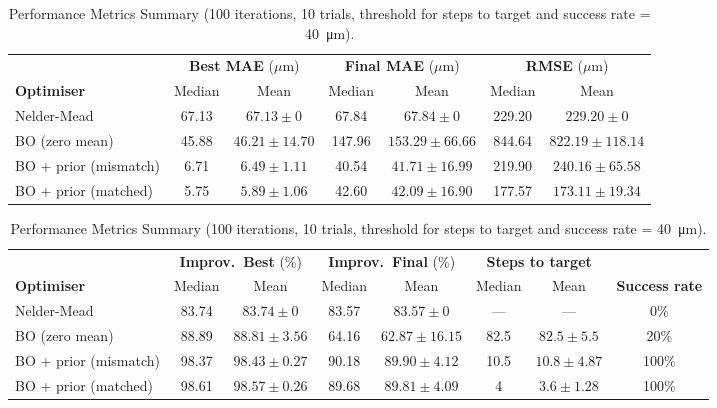 \clearpage
\begin{table}
\centering
\caption{Performance Metrics Summary (100 iterations, 10 trials, threshold for steps to target and success rate = \SI{40}{\micro\metre}).}
\label{table:results_main}
\small
\renewcommand{\arraystretch}{1.3}

\vspace{0.5em}
\begin{tabular}{l cc cc cc}
\toprule
 & \multicolumn{2}{c}{\textbf{Best MAE} ($\mu$m)}
 & \multicolumn{2}{c}{\textbf{Final MAE} ($\mu$m)}
 & \multicolumn{2}{c}{\textbf{RMSE} ($\mu$m)} \\
\cmidrule(lr){2-3} \cmidrule(lr){4-5} \cmidrule(lr){6-7}
\textbf{Optimiser} & Median & Mean & Median & Mean & Median & Mean \\
\midrule
Nelder-Mead           & 67.13 & $67.13 \pm 0$       & 67.84  & $67.84 \pm 0$        & 229.20 & $229.20 \pm 0$       \\
BO (zero mean)        & 45.88 & $46.21 \pm 14.70$   & 147.96 & $153.29 \pm 66.66$   & 844.64 & $822.19 \pm 118.14$ \\
BO + prior (mismatch) & 6.71  & $6.49 \pm 1.11$     & 40.54  & $41.71 \pm 16.99$    & 219.90 & $240.16 \pm 65.58$  \\
BO + prior (matched)  & 5.75  & $5.89 \pm 1.06$     & 42.60  & $42.09 \pm 16.90$    & 177.57 & $173.11 \pm 19.34$  \\
\bottomrule
\end{tabular}

\vspace{1.5em}

\begin{tabular}{l cc cc cc c}
\toprule
 & \multicolumn{2}{c}{\textbf{Improv.\ Best} (\%)}
 & \multicolumn{2}{c}{\textbf{Improv.\ Final} (\%)}
 & \multicolumn{2}{c}{\textbf{Steps to target}}
 & \\
\cmidrule(lr){2-3} \cmidrule(lr){4-5} \cmidrule(lr){6-7}
\textbf{Optimiser} & Median & Mean & Median & Mean & Median & Mean & \textbf{Success rate} \\
\midrule
Nelder-Mead           & 83.74 & $83.74 \pm 0$    & 83.57 & $83.57 \pm 0$      & ---  & ---              & 0\%   \\
BO (zero mean)        & 88.89 & $88.81 \pm 3.56$ & 64.16 & $62.87 \pm 16.15$  & 82.5 & $82.5 \pm 5.5$   & 20\%  \\
BO + prior (mismatch) & 98.37 & $98.43 \pm 0.27$ & 90.18 & $89.90 \pm 4.12$   & 10.5 & $10.8 \pm 4.87$  & 100\% \\
BO + prior (matched)  & 98.61 & $98.57 \pm 0.26$ & 89.68 & $89.81 \pm 4.09$   & 4    & $3.6 \pm 1.28$   & 100\% \\
\bottomrule
\end{tabular}

\end{table}
\clearpage

